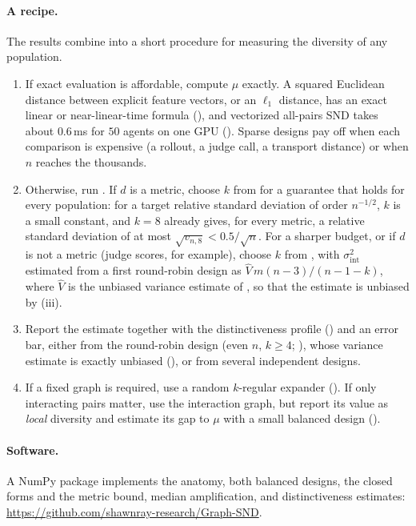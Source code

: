 \documentclass[twoside,11pt]{article}
\newcommand{\sigmaint}{\sigma^2_{\mathrm{int}}}
\begin{document}
\paragraph{A recipe.}
The results combine into a short procedure for measuring the diversity of
any population.
\begin{enumerate}
  \item If exact evaluation is affordable, compute $\mu$ exactly. A squared
  Euclidean distance between explicit feature vectors, or an $\ell_1$
  distance, has an exact linear or near-linear-time formula
  (), and vectorized all-pairs SND takes about
  $0.6$\,ms for $50$ agents on one GPU (). Sparse designs pay
  off when each comparison is expensive (a rollout, a judge call, a transport
  distance) or when $n$ reaches the thousands.
  \item Otherwise, run . If $d$ is a metric, choose $k$
  from  for a guarantee that holds for every population:
  for a target relative standard deviation of order $n^{-1/2}$, $k$ is a
  small constant, and $k=8$ already gives, for every metric, a relative
  standard deviation of at most $\sqrt{v_{n,8}}<0.5/\sqrt{n}$. For a sharper
  budget, or if $d$ is not a metric (judge scores, for example), choose $k$
  from , with $\sigmaint$ estimated from a first
  round-robin design as $\widehat V\,m(n-3)/(n-1-k)$, where $\widehat V$ is
  the unbiased variance estimate of , so that the
  estimate is unbiased by (iii).
  \item Report the estimate together with the distinctiveness profile
  () and an error bar, either from the
  round-robin design (even $n$, $k\ge4$; ), whose
  variance estimate is exactly unbiased (), or from
  several independent designs.
  \item If a fixed graph is required, use a random $k$-regular expander
  (). If only interacting pairs matter, use the
  interaction graph, but report its value as \emph{local} diversity and
  estimate its gap to $\mu$ with a small balanced design
  ().
\end{enumerate}

\paragraph{Software.}
A NumPy package implements the anatomy, both balanced designs, the closed
forms and the metric bound, median amplification, and distinctiveness
estimates: \url{https://github.com/shawnray-research/Graph-SND}.
\end{document}
